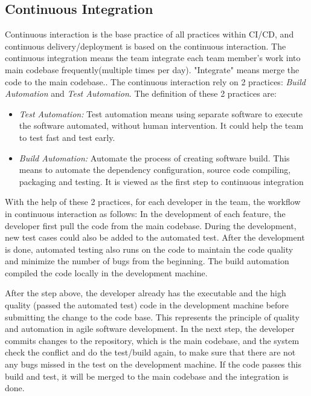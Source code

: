 \subsection{Continuous Integration}
Continuous interaction is the base practice of all practices within CI/CD, and continuous delivery/deployment is based on the continuous interaction.\cite{Continuo67:online}
The continuous integration means the team integrate each team member's work into main codebase frequently(multiple times per day). "Integrate" means merge the code to the main codebase.\cite{fowler2006continuous}. The continuous interaction rely on 2 practices: \textit{Build Automation} and  \textit{Test Automation}. The definition of these 2 practices are:
\begin{itemize}
    \item \textit{Test Automation:} Test automation means using separate software to execute the software automated, without human intervention. It could help the team to test fast and test early. \cite{Testauto48:online}
    \item \textit{Build Automation:} Automate the process of creating software build. This means to automate the dependency configuration, source code compiling, packaging and testing. It is viewed as the first step to continuous integration\cite{Buildaut62:online}
\end{itemize}
With the help of these 2 practices, for each developer in the team, the workflow in continuous interaction as follows:\cite{fowler2006continuous} In the development of each feature, the developer first pull the code from the main codebase. During the development, new test cases could also be added to the automated test. After the development is done, automated testing also runs on the code to maintain the code quality and minimize the number of bugs from the beginning. The build automation compiled the code locally in the development machine. 
\par
After the step above, the developer already has the executable and the high quality (passed the automated test) code in the development machine before submitting the change to the code base. This represents the principle of quality and automation in agile software development. In the next step, the developer commits changes to the repository, which is the main codebase, and the system check the conflict and do the test/build again, to make sure that there are not any bugs missed in the test on the development machine.
If the code passes this build and test, it will be merged to the main codebase and the integration is done.

